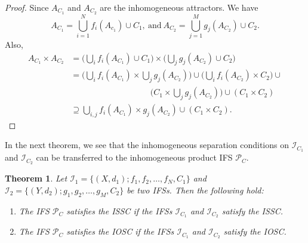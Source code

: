 \documentclass[12pt,oneside,reqno]{amsart}
\newtheorem{theorem}{Theorem}[section]
\theoremstyle{definition}
\theoremstyle{remark}
\newtheorem{remark}[theorem]{Remark}
\begin{document}
\begin{proof}
   Since $A_{C_1}$ and $A_{C_2}$ are the inhomogeneous attractors. We have
   $$A_{C_1}= \bigcup_{i=1}^N f_i (A_{c_1}) \cup C_1, ~ \text{and}~ A_{C_2}= \bigcup_{j=1}^M g_j(A_{C_2}) \cup C_2.$$
   Also,
   \begin{equation*}
   \begin{aligned}
       A_{C_1} \times A_{C_2} &= \bigg(\bigcup_{i} f_i(A_{C_1}) \cup C_1 \bigg) \times \bigg(\bigcup_{j} g_j(A_{C_2}) \cup C_2 \bigg) \\&= \bigg(\bigcup_{i} f_i(A_{C_1}) \times \bigcup_{j} g_j(A_{C_2})\bigg) \cup \bigg(\bigcup_{i} f_i(A_{C_2}) \times C_2 \bigg) \cup \\& \hspace{4cm} \bigg(C_1 \times \bigcup_{j} g_j(A_{C_2}) \bigg) \cup (C_1 \times C_2)  \\& \supseteq \bigcup_{i,j} f_i(A_{C_1}) \times g_j(A_{C_2}) \cup (C_1 \times C_2).
       \end{aligned}
   \end{equation*}
\end{proof}
 In the next theorem, we see that the inhomogeneous separation conditions on $\mathcal{I}_{C_1}$ and $\mathcal{I}_{C_2}$ can be transferred to the inhomogeneous product IFS $\mathcal{P}_C$.
\begin{theorem}
    Let $\mathcal{I}_1 = \{(X, d_1); f_1, f_2, \ldots, f_N, C_1\}$ and $\mathcal{I}_2 = \{(Y, d_2); g_1, g_2, \ldots, g_M, C_2\}$ be two IFSs. Then the following hold:
    \begin{enumerate}
        \item The IFS $\mathcal{P}_C$ satisfies the ISSC if the IFSs $\mathcal{I}_{C_1}$ and $\mathcal{I}_{C_2}$ satisfy the ISSC.
        \item The IFS $\mathcal{P}_C$ satisfies the IOSC if the IFSs $\mathcal{I}_{C_1}$ and $\mathcal{I}_{C_2}$ satisfy the IOSC.
    \end{enumerate}
\end{theorem}
\end{document}
